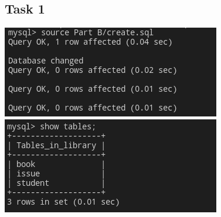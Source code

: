 \documentclass{article}
\begin{document}
\subsection*{Task 1}
\includegraphics[scale=0.6]{screenshots/partb/create.png}\\
\includegraphics[scale=0.6]{screenshots/partb/tables.png}
\end{document}

